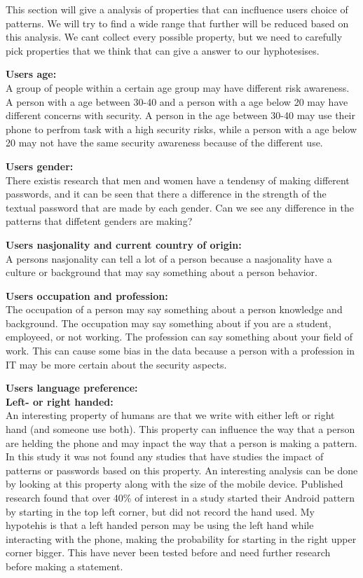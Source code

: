   This section will give a analysis of properties that can incfluence users choice of patterns. We will try to find a wide range that further will be reduced based on this analysis. We cant collect every possible property, but we need to carefully pick properties that we think that can give a answer to our hyphotesises.

    {\bf Users age:} \\
    A group of people within a certain age group may have different risk awareness. A person with a age between 30-40 and a person with a age below 20 may have different concerns with security. A person in the age between 30-40 may use their phone to perfrom task with a high security risks, while a person with a age below 20 may not have the same security awareness because of the different use. 

    {\bf Users gender:} \\
    There existis research that men and women have a tendensy of making different passwords, and it can be seen that there a difference in the strength of the textual password that are made by each gender. Can we see any difference in the patterns that diffetent genders are making?

    {\bf Users nasjonality and current country of origin:} \\
    A persons nasjonality can tell a lot of a person because a nasjonality have a culture or background that may say something about a person behavior. 

    {\bf Users occupation and profession:} \\
    The occupation of a person may say something about a person knowledge and background. The occupation may say something about if you are a student, employeed, or not working. The profession can say something about your field of work. This can cause some bias in the data because a person with a profession in IT may be more certain about the security aspects. 

    {\bf Users language preference:} \\

    {\bf Left- or right handed:} \\
    An interesting property of humans are that we write with either left or right hand (and someone use both). This property can influence the way that a person are helding the phone and may inpact the way that a person is making a pattern. In this study it was not found any studies that have studies the impact of patterns or passwords based on this property. An interesting analysis can be done by looking at this property along with the size of the mobile device. Published research \cite{Uellenbeck} found that over 40\% of interest in a study started their Android pattern by starting in the top left corner, but did not record the hand used. My hypotehis is that a left handed person may be using the left hand while interacting with the phone, making the probability for starting in the right upper corner bigger. This have never been tested before and need further research before making a statement. 

